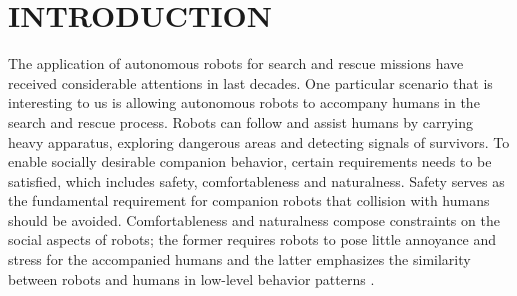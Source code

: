 \documentclass[letterpaper, 10 pt, conference]{ieeeconf}
\begin{document}
\section{INTRODUCTION} \label{sec:intro}
The application of autonomous robots for search and rescue missions have received considerable attentions in last decades.
One particular scenario that is interesting to us is allowing autonomous robots to accompany humans in the search and rescue process.
Robots can follow and assist humans by carrying heavy apparatus, exploring dangerous areas and detecting signals of survivors.
To enable socially desirable companion behavior, certain requirements needs to be satisfied, which includes safety, comfortableness and naturalness. 
Safety serves as the fundamental requirement for companion robots that collision with humans should be avoided. 
Comfortableness and naturalness compose constraints on the social aspects of robots;
the former requires robots to pose little annoyance and stress for the accompanied humans and the latter emphasizes the similarity between robots and humans in low-level behavior patterns \cite{kruse2013human}.
\end{document}

